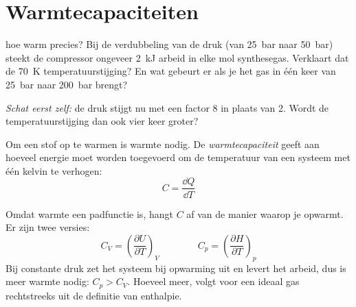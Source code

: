 \section{Warmtecapaciteiten}
\label{sec:warmtecapaciteiten}

\begin{casus}{hoe warm precies?}
Bij de verdubbeling van de druk (van \SI{25}{\bar} naar \SI{50}{\bar}) steekt de compressor ongeveer \SI{2}{\kilo\joule} arbeid in elke mol synthesegas. Verklaart dat de \SI{70}{\kelvin} temperatuurstijging? En wat gebeurt er als je het gas in \'e\'en keer van \SI{25}{\bar} naar \SI{200}{\bar} brengt?

\emph{Schat eerst zelf:} de druk stijgt nu met een factor 8 in plaats van 2. Wordt de temperatuurstijging dan ook vier keer groter?
\end{casus}

Om een stof op te warmen is warmte nodig. De \emph{warmtecapaciteit} geeft aan hoeveel energie moet worden toegevoerd om de temperatuur van een systeem met \'e\'en kelvin te verhogen:
\begin{equation}
C = \frac{\dd Q}{\dd T}
\end{equation}

Omdat warmte een padfunctie is, hangt $C$ af van de manier waarop je opwarmt. Er zijn twee versies:
\begin{equation}
C_V = \left(\frac{\partial U}{\partial T}\right)_V
\qquad\qquad
C_p = \left(\frac{\partial H}{\partial T}\right)_p
\end{equation}
Bij constante druk zet het systeem bij opwarming uit en levert het arbeid, dus is meer warmte nodig: $C_p > C_V$. Hoeveel meer, volgt voor een ideaal gas rechtstreeks uit de definitie van enthalpie.

